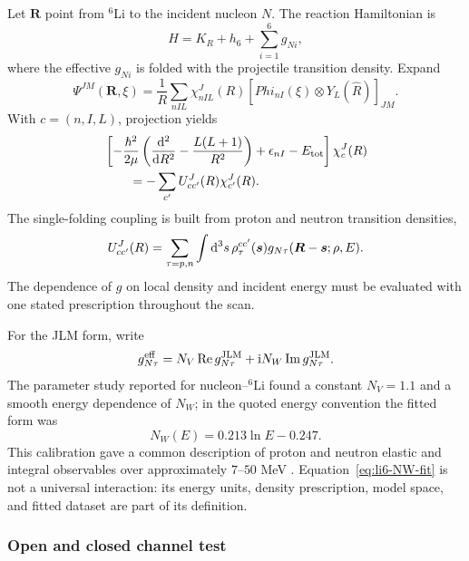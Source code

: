 Let $\bm R$ point from $^6$Li to the incident nucleon $N$.  The reaction
Hamiltonian is
\begin{equation}
  H=K_R+h_6+\sum_{i=1}^{6}g_{Ni},
  \label{eq:n-li6-reaction-H}
\end{equation}
where the effective $g_{Ni}$ is folded with the projectile transition density.
Expand
\begin{equation}
  \Psi^{JM}(\bm R,\xi)
  =\frac{1}{R}\sum_{nIL}
  \chi_{nIL}^{J}(R)
  \left[Phi_{nI}(\xi)\otimes Y_L(\hat R)\right]_{JM}.
  \label{eq:n-li6-channel-expansion}
\end{equation}
With $c=(n,I,L)$, projection yields
\begin{align}
  &\left[-\frac{\hbar^2}{2\mu}
   \left(\frac{\mathrm{d}^2}{\mathrm{d} R^2}-\frac{L(L+1)}{R^2}\right)
  +\epsilon_{nI}-E_{\mathrm{tot}}\right]\chi_c^J(R)
  \notag\\
  &\qquad=-\sum_{c'}U_{cc'}^J(R)\chi_{c'}^J(R).
  \label{eq:n-li6-cc}
\end{align}
The single-folding coupling is built from proton and neutron transition
densities,
\begin{equation}
  U_{cc'}^J(R)
  =\sum_{\tau=p,n}\int\mathrm{d}^3s\,
   \rho^{cc'}_\tau(\bm s)
   g_{N\tau}(\bm R-\bm s;\rho,E).
  \label{eq:n-li6-folding}
\end{equation}
The dependence of $g$ on local density and incident energy must be evaluated
with one stated prescription throughout the scan.

For the JLM form, write
\begin{equation}
  g_{N\tau}^{\mathrm{eff}}
  =N_V\operatorname{Re}g_{N\tau}^{\mathrm{JLM}}
   +\mathrm{i} N_W\operatorname{Im}g_{N\tau}^{\mathrm{JLM}}.
  \label{eq:lab-jlm-renormalization}
\end{equation}
The parameter study reported for nucleon--$^6$Li found a constant
$N_V=1.1$ and a smooth energy dependence of $N_W$; in the quoted energy
convention the fitted form was
\begin{equation}
  N_W(E)=0.213\ln E-0.247.
  \label{eq:li6-NW-fit}
\end{equation}
This calibration gave a common description of proton and neutron elastic and
integral observables over approximately $7$--$50$ MeV
\cite{Ogata:2026LiCDCC}.  Equation~\eqref{eq:li6-NW-fit} is not a universal
interaction: its energy units, density prescription, model space, and fitted
dataset are part of its definition.

\subsubsection{Open and closed channel test}


